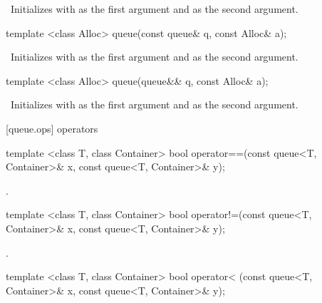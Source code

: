 \begin{itemdescr}
\pnum
\effects\ Initializes  with  as the first argument and 
as the second argument.
\end{itemdescr}

\begin{itemdecl}
template <class Alloc>
  queue(const queue& q, const Alloc& a);
\end{itemdecl}

\begin{itemdescr}
\pnum
\effects\ Initializes  with  as the first argument and  as the
second argument.
\end{itemdescr}

\begin{itemdecl}
template <class Alloc>
  queue(queue&& q, const Alloc& a);
\end{itemdecl}

\begin{itemdescr}
\pnum
\effects\ Initializes  with  as the first argument and 
as the second argument.
\end{itemdescr}

[queue.ops]{ operators}

%
\begin{itemdecl}
template <class T, class Container>
    bool operator==(const queue<T, Container>& x,
                    const queue<T, Container>& y);
\end{itemdecl}

\begin{itemdescr}
\pnum
\returns
{}.
\end{itemdescr}

%
\begin{itemdecl}
template <class T, class Container>
    bool operator!=(const queue<T, Container>& x,
                    const queue<T, Container>& y);
\end{itemdecl}

\begin{itemdescr}
\pnum
\returns
{}.
\end{itemdescr}

%
\begin{itemdecl}
template <class T, class Container>
    bool operator< (const queue<T, Container>& x,
                    const queue<T, Container>& y);
\end{itemdecl}

